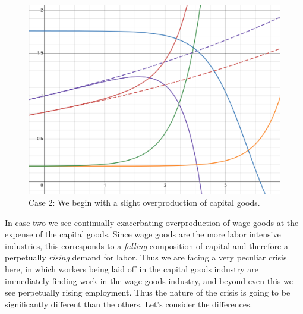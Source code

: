 \documentclass{article}
\theoremstyle{theorem}
\begin{document}
\begin{figure}[H]
\centering
\includegraphics[scale=.7]{Images/divergenceHardCase}
\caption{Case 2: We begin with a slight overproduction of capital goods.}
\end{figure}
In case two we see continually exacerbating overproduction of wage goods at the expense of the capital goods. Since wage goods are the more labor intensive industries, this corresponds to a \emph{falling} composition of capital and therefore a perpetually \emph{rising} demand for labor. Thus we are facing a very peculiar crisis here, in which workers being laid off in the capital goods industry are immediately finding work in the wage goods industry, and beyond even this we see perpetually rising employment. Thus the nature of the crisis is going to be significantly different than the others. Let's consider the differences. \par 
\end{document}
